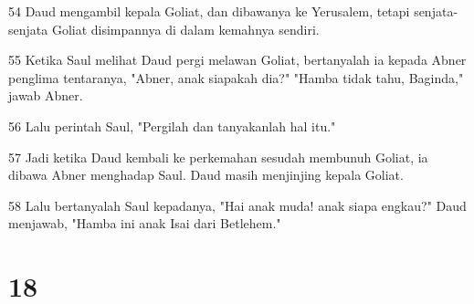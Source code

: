 \par 54 Daud mengambil kepala Goliat, dan dibawanya ke Yerusalem, tetapi senjata-senjata Goliat disimpannya di dalam kemahnya sendiri.
\par 55 Ketika Saul melihat Daud pergi melawan Goliat, bertanyalah ia kepada Abner penglima tentaranya, "Abner, anak siapakah dia?" "Hamba tidak tahu, Baginda," jawab Abner.
\par 56 Lalu perintah Saul, "Pergilah dan tanyakanlah hal itu."
\par 57 Jadi ketika Daud kembali ke perkemahan sesudah membunuh Goliat, ia dibawa Abner menghadap Saul. Daud masih menjinjing kepala Goliat.
\par 58 Lalu bertanyalah Saul kepadanya, "Hai anak muda! anak siapa engkau?" Daud menjawab, "Hamba ini anak Isai dari Betlehem."

\chapter{18}

